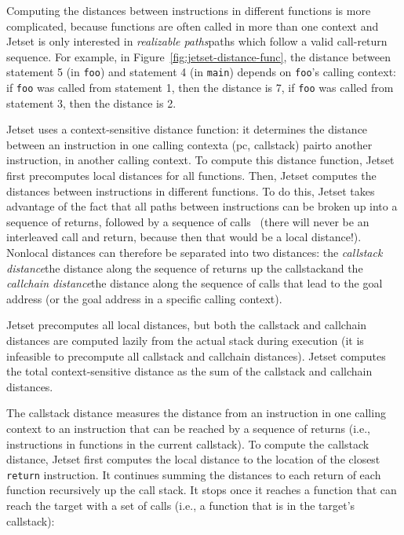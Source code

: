 Computing the distances between instructions in different functions is more complicated, because functions are often called in more than one context and Jetset is only interested in \textit{realizable paths}\textemdash paths which follow a valid call-return sequence.
For example, in Figure~\ref{fig:jetset-distance-func}, the distance between statement 5 (in \texttt{foo}) and statement 4 (in \texttt{main}) depends on \texttt{foo}'s calling context: if \texttt{foo} was called from statement 1, then the distance is 7, if \texttt{foo} was called from statement 3, then the distance is 2.

Jetset uses a context-sensitive distance function: it determines the distance between an instruction in one calling context\textemdash a (pc, callstack) pair\textemdash to another instruction, in another calling context.
To compute this distance function, Jetset first precomputes local distances for all functions.
Then, Jetset computes the distances between instructions in different functions.
To do this, Jetset takes advantage of the fact that all paths between instructions can be broken up into a sequence of returns, followed by a sequence of calls~\cite{directedsymex} (there will never be an interleaved call and return, because then that would be a local distance!).
Nonlocal distances can therefore be separated into two distances: the \textit{callstack distance}\textemdash the distance along the sequence of returns up the callstack\textemdash and the \textit{callchain distance}\textemdash the distance along the sequence of calls that lead to the goal address (or the goal address in a specific calling context).

Jetset precomputes all local distances, but both the callstack and callchain distances are computed lazily from the actual stack during execution (it is infeasible to precompute all callstack and callchain distances).
Jetset computes the total context-sensitive distance as the sum of the callstack and callchain distances.

The callstack distance measures the distance from an instruction in one calling context to an instruction that can be reached by a sequence of returns (i.e., instructions in functions in the current callstack).
To compute the callstack distance, Jetset first computes the local distance to the location of the closest \texttt{return} instruction.
It continues summing the distances to each return of each function recursively up the call stack.
It stops once it reaches a function that can reach the target with a set of calls (i.e., a function that is in the target's callstack):

